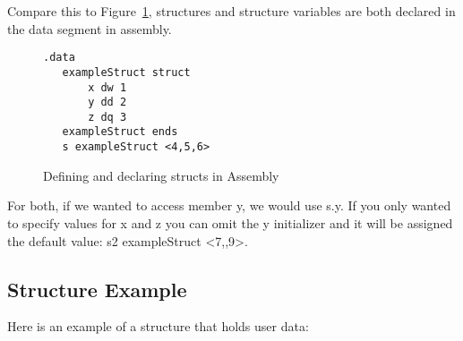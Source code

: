 Compare this to Figure~\ref{fig:AsmStructs}, structures and 
structure variables are both declared in the data segment in assembly. 
\begin{figure}[t]
\begin{lstlisting}[language={[x86masm]Assembler}]
.data
   exampleStruct struct
	   x dw 1
	   y dd 2
	   z dq 3
   exampleStruct ends
   s exampleStruct <4,5,6>
\end{lstlisting}
\caption{Defining and declaring structs in Assembly\label{fig:AsmStructs}}
\end{figure}
For both, if we wanted to access member y, we would use {\code s.y}.  If you only wanted
to specify values for x and z you can omit the y initializer and it will be assigned the default 
value: {\code s2 exampleStruct <7,,9>}.  

\subsection{Structure Example}
Here is an example of a structure that holds user data:



